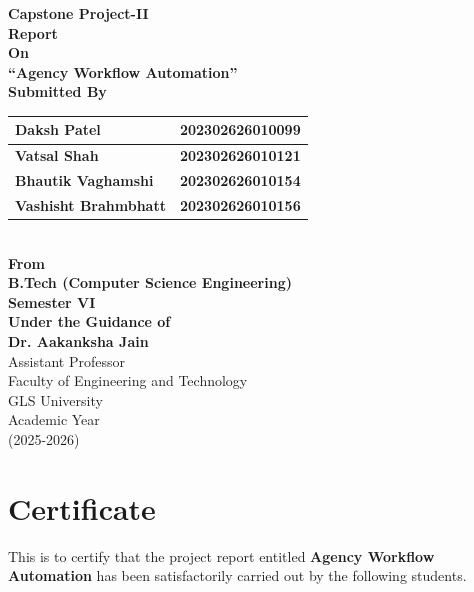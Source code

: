 \documentclass[12pt,a4paper]{report}
\newcommand{\reporttitle}{Agency Workflow Automation}
\begin{document}
\begin{titlepage}
    \centering
    \vspace*{0.5in}

    {\Large \textbf{Capstone Project-II}}\\[0.25in]
    {\Large \textbf{Report}}\\[0.25in]
    {\Large \textbf{On}}\\[0.25in]
    {\LARGE \textbf{``\reporttitle''}}\\[0.9in]

    \textbf{Submitted By}\\[0.25in]

    \begin{tabular}{|>{\raggedright\arraybackslash}p{}|>{\centering\arraybackslash}p{}|}
        \hline
        \textbf{Daksh Patel} & \textbf{202302626010099} \\ \hline
        \textbf{Vatsal Shah} & \textbf{202302626010121} \\ \hline
        \textbf{Bhautik Vaghamshi} & \textbf{202302626010154} \\ \hline
        \textbf{Vashisht Brahmbhatt} & \textbf{202302626010156} \\ \hline
    \end{tabular}\\[0.9in]

    \textbf{From}\\[0.15in]
    \textbf{B.Tech (Computer Science Engineering)}\\[0.15in]
    \textbf{Semester VI}\\[0.35in]

    \textbf{Under the Guidance of}\\[0.15in]
    \textbf{Dr. Aakanksha Jain}\\[0.1in]
    Assistant Professor\\[0.6in]

    Faculty of Engineering and Technology\\
    GLS University\\[0.25in]
    Academic Year\\[0.1in]
    (2025-2026)
\end{titlepage}

\setcounter{page}{1}

\chapter*{Certificate}
This is to certify that the project report entitled \textbf{Agency Workflow Automation} has been satisfactorily carried out by the following students.
\end{document}
